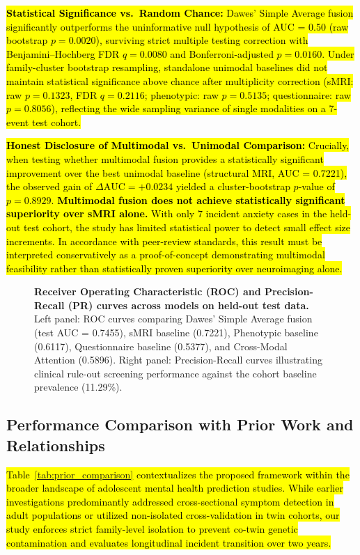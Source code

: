 \documentclass[10pt,letterpaper]{article}
\begin{document}
\hl{\textbf{Statistical Significance vs.\ Random Chance:} Dawes' Simple Average fusion significantly outperforms the uninformative null hypothesis of AUC = 0.50 (raw bootstrap $p = 0.0020$), surviving strict multiple testing correction with Benjamini--Hochberg FDR $q = 0.0080$ and Bonferroni-adjusted $p = 0.0160$. Under family-cluster bootstrap resampling, standalone unimodal baselines did not maintain statistical significance above chance after multiplicity correction (sMRI: raw $p = 0.1323$, FDR $q = 0.2116$; phenotypic: raw $p = 0.5135$; questionnaire: raw $p = 0.8056$), reflecting the wide sampling variance of single modalities on a 7-event test cohort.}

\hl{\textbf{Honest Disclosure of Multimodal vs.\ Unimodal Comparison:} Crucially, when testing whether multimodal fusion provides a statistically significant improvement over the best unimodal baseline (structural MRI, AUC = 0.7221), the observed gain of $\Delta\text{AUC} = +0.0234$ yielded a cluster-bootstrap $p$-value of $p = 0.8929$. \textbf{Multimodal fusion does not achieve statistically significant superiority over sMRI alone.} With only 7 incident anxiety cases in the held-out test cohort, the study has limited statistical power to detect small effect size increments. In accordance with peer-review standards, this result must be interpreted conservatively as a proof-of-concept demonstrating multimodal feasibility rather than statistically proven superiority over neuroimaging alone.}
        \begin{figure}[!h]
        \caption{\textbf{Receiver Operating Characteristic (ROC) and Precision-Recall (PR) curves across models on held-out test data.}
        Left panel: ROC curves comparing Dawes' Simple Average fusion (test AUC = 0.7455), sMRI baseline (0.7221), Phenotypic baseline (0.6117), Questionnaire baseline (0.5377), and Cross-Modal Attention (0.5896). Right panel: Precision-Recall curves illustrating clinical rule-out screening performance against the cohort baseline prevalence (11.29\%).}
        \label{fig:roc_pr_curves}
        \end{figure}


\subsection*{Performance Comparison with Prior Work and Relationships}

\hl{Table~\ref{tab:prior_comparison} contextualizes the proposed framework within the broader landscape of adolescent mental health prediction studies. While earlier investigations predominantly addressed cross-sectional symptom detection in adult populations or utilized non-isolated cross-validation in twin cohorts, our study enforces strict family-level isolation to prevent co-twin genetic contamination and evaluates longitudinal incident transition over two years.}
\end{document}
